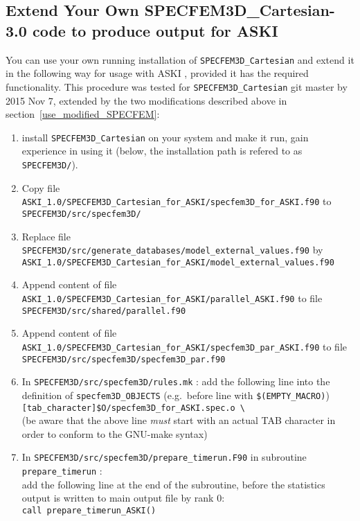 \documentclass[12pt,a4paper]{article}
\newcommand{\lcode}[1]{\nolinkurl{#1}}
\newcommand{\lcodetitle}[1]{ {\ttfamily #1} }
\newcommand{\ASKI}{ {\ttfamily ASKI} }
\begin{document}
\subsection{Extend Your Own \lcodetitle{SPECFEM3D\_Cartesian-3.0} code to produce output for \ASKI} \label{extent_to_ASKI}
You can use your own running installation of \lcode{SPECFEM3D_Cartesian} and extend it in the following way
for usage with \ASKI, provided it has the required functionality. 
This procedure was tested for \lcode{SPECFEM3D_Cartesian} git master by 2015 Nov 7, 
extended by the two modifications described above in section~\ref{use_modified_SPECFEM}{}:
\begin{enumerate}
\item install \lcode{SPECFEM3D_Cartesian} on your system and make it run, gain 
   experience in using it (below, the installation path is refered to as 
   \lcode{SPECFEM3D/}).

\item Copy file \lcode{ASKI_1.0/SPECFEM3D_Cartesian_for_ASKI/specfem3D_for_ASKI.f90} to 
   \lcode{SPECFEM3D/src/specfem3D/}

\item Replace file \lcode{SPECFEM3D/src/generate_databases/model_external_values.f90} by 
   \lcode{ASKI_1.0/SPECFEM3D_Cartesian_for_ASKI/model_external_values.f90}

\item Append content of file \lcode{ASKI_1.0/SPECFEM3D_Cartesian_for_ASKI/parallel_ASKI.f90}
   to file \lcode{SPECFEM3D/src/shared/parallel.f90}

\item Append content of file \lcode{ASKI_1.0/SPECFEM3D_Cartesian_for_ASKI/specfem3D_par_ASKI.f90}
   to file \lcode{SPECFEM3D/src/specfem3D/specfem3D_par.f90}

\item In \lcode{SPECFEM3D/src/specfem3D/rules.mk} : add the following line into the 
   definition of \lcode{specfem3D_OBJECTS} (e.g.\ before line with \lcode{$(EMPTY_MACRO)})\\
\lcode{[tab_character]$O/specfem3D_for_ASKI.spec.o \ }\\
   (be aware that the above line \emph{must} start with an actual TAB character in order 
   to conform to the GNU-make syntax)

\item In \lcode{SPECFEM3D/src/specfem3D/prepare_timerun.F90} in subroutine \lcode{prepare_timerun} :\\
   add the following line at the end of the subroutine, before the statistics 
   output is written to main output file by rank 0:\\
   \lcode{call prepare_timerun_ASKI()}


\end{enumerate}
\end{document}
